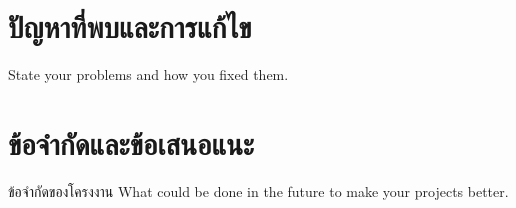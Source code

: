\documentclass[12pt,oneside,openright,a4paper]{cpe-thai-project}
\begin{document}
\section{ปัญหาที่พบและการแก้ไข}
State your problems and how you fixed them.

\section{ข้อจำกัดและข้อเสนอแนะ}
ข้อจำกัดของโครงงาน What could be done in the future to make your projects better.



\makeatletter
\g@addto@macro{\UrlBreaks}{\UrlOrds}
\makeatother




 \\
\end{document}

